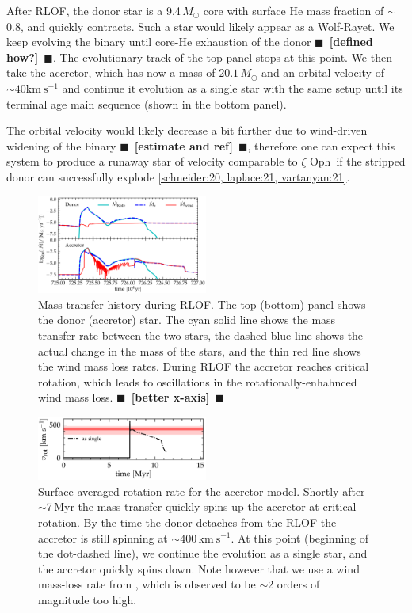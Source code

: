 \documentclass[twocolumn,twocolappendix,trackchanges]{aastex63}
\newcommand{\kms}{{\mathrm{km\ s^{-1}}}}
\newcommand{\zoph}{$\zeta$ Oph}
\newcommand{\todo}[1]{{\large $\blacksquare$~\textbf{\color{red}[#1]}}~$\blacksquare$}
\begin{document}
After RLOF, the donor star is a 9.4$\,M_\odot$ core with surface He
mass fraction of $\sim$0.8, and quickly contracts. Such a star would
likely appear as a Wolf-Rayet. We keep evolving the binary until
core-He exhaustion of the donor \todo{defined how?}. The evolutionary
track of the top panel stops at this point.  We then take the
accretor, which has now a mass of $20.1\,M_\odot$ and an orbital
velocity of $\sim 40\kms$ and continue it
evolution as a single star with the same setup until its terminal age
main sequence (shown in the bottom panel).

The orbital velocity would likely decrease a bit further due to
wind-driven widening of the binary \todo{estimate and ref}, therefore
one can expect this system to produce a runaway star of velocity
comparable to \zoph\ if the stripped donor can successfully explode
\ref{schneider:20, laplace:21, vartanyan:21}.



\begin{figure}[htbp]
  \includegraphics[width=0.5\textwidth]{MT}
  \caption{Mass transfer history during RLOF. The top (bottom) panel
    shows the donor (accretor) star. The cyan solid line shows the
    mass transfer rate between the two stars, the dashed blue line
    shows the actual change in the mass of the stars, and the thin red
    line shows the wind mass loss rates. During RLOF the accretor
    reaches critical rotation, which leads to oscillations in the
    rotationally-enhahnced wind mass loss. \todo{better x-axis}}
  \label{fig:MT}
\end{figure}

\begin{figure}[htbp]
  \includegraphics[width=0.5\textwidth]{zeta_rot}
  \caption{Surface averaged rotation rate for the accretor
    model. Shortly after $\sim$7\,Myr the mass transfer quickly spins
    up the accretor at critical rotation. By the time the donor
    detaches from the RLOF the accretor is still spinning at
    $\sim$$400\,\kms$. At this point (beginning of the dot-dashed line), we continue the evolution as a single star, and the accretor quickly spins down. Note however that we use a wind mass-loss rate from \cite{vink:01}, which is observed to be
    $\sim$2 orders of magnitude too high.}
  \label{fig:rot}
\end{figure}
\end{document}
